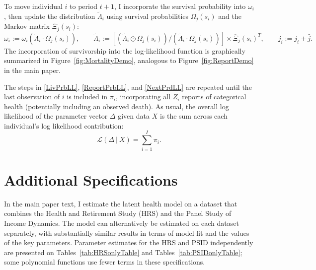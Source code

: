 \documentclass[12pt,pdftex,letterpaper]{article}
\newcommand{\Age}{j}
\newcommand{\Sex}{s}
\newcommand{\AgeIncr}{\hat{\Age}}
\newcommand{\Data}{X}
\newcommand{\ParamVec}{\Delta}
\newcommand{\LivPrb}{\Omega}
\newcommand{\CumLivPrb}{\omega}
\newcommand{\TransPrb}{\Xi}
\newcommand{\HealthDstnPcvd}{\widetilde{\Lambda}}
\newcommand{\LL}{\pi}
\newcommand{\RootDir}{..}
\newcommand{\TablesDir}{\RootDir/Tables}
\begin{document}
To move individual $i$ to period $t+1$, I incorporate the survival probability into $\CumLivPrb_{i}$, then update the  distribution $\HealthDstnPcvd_{i}$ using survival probabilities $\LivPrb_\Age(\Sex_i)$ and the Markov matrix $\overline{\TransPrb}_\Age(\Sex_i)$:
\begin{equation}\label{NextPrdLL}
\CumLivPrb_i := \CumLivPrb_i (\HealthDstnPcvd_{i} \cdot \LivPrb_\Age(\Sex_i)), \qquad \HealthDstnPcvd_{i} := \left[ (\HealthDstnPcvd_{i} \odot \LivPrb_\Age(\Sex_i)) / (\HealthDstnPcvd_{i} \cdot \LivPrb_\Age(\Sex_i)) \right] \times \overline{\TransPrb}_\Age(\Sex_i)^T, \qquad \Age_i := \Age_i + \AgeIncr.
\end{equation}
The incorporation of survivorship into the log-likelihood function is graphically summarized in Figure~\ref{fig:MortalityDemo}, analogous to Figure~\ref{fig:ReportDemo} in the main paper.

The steps in \eqref{LivPrbLL}, \eqref{ReportPrbLL}, and \eqref{NextPrdLL} are repeated until the last observation of $i$ is included in $\LL_i$, incorporating all $Z_i$ reports of categorical health (potentially including an observed death). As usual, the overall log likelihood of the parameter vector $\ParamVec$ given data $\Data$ is the sum across each individual's log likelihood contribution:
\begin{equation}
\mathcal{L}(\ParamVec~|~\Data) = \sum_{i=1}^{I} \LL_i.
\end{equation}


\section{Additional Specifications}\label{app:MoreSpecs}

In the main paper text, I estimate the latent health model on a dataset that combines the Health and Retirement Study (HRS) and the Panel Study of Income Dynamics. The model can alternatively be estimated on each dataset separately, with substantially similar results in terms of model fit and the values of the key parameters. Parameter estimates for the HRS and PSID independently are presented on Tables~\ref{tab:HRSonlyTable} and Tables~\ref{tab:PSIDonlyTable}; some polynomial functions use fewer terms in these specifications.






\end{document}
